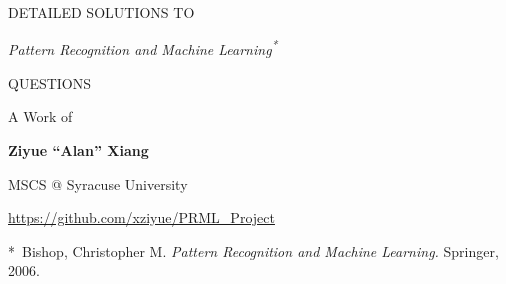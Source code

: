 \begin{titlepage}
	\vspace*{4cm}
	{\Huge \bfseries \scshape
	\begin{center}
		DETAILED SOLUTIONS TO
		
		{\itshape \huge Pattern Recognition and Machine Learning\textsuperscript{*}}
		
		QUESTIONS
	\end{center}
	}
	
	\vspace*{1cm}
	
	{\Large
	\begin{center}
		A Work of
		
		{\bfseries Ziyue ``Alan'' Xiang}
		
		
		MSCS @ Syracuse University
		
		\vspace*{2em}
		\url{https://github.com/xziyue/PRML_Project}
	\end{center}
	}

\vfill
{\footnotesize
	*~Bishop, Christopher M. \textit{Pattern Recognition and Machine Learning.} Springer, 2006.
}
	
\end{titlepage}
